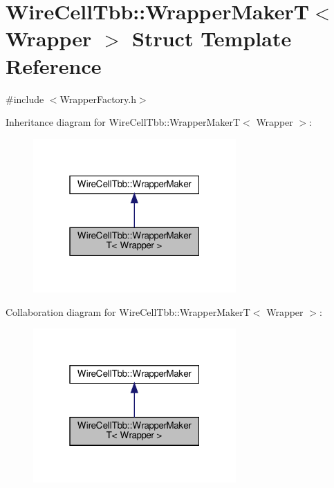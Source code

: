 \hypertarget{struct_wire_cell_tbb_1_1_wrapper_maker_t}{}\section{Wire\+Cell\+Tbb\+:\+:Wrapper\+MakerT$<$ Wrapper $>$ Struct Template Reference}
\label{struct_wire_cell_tbb_1_1_wrapper_maker_t}


{\ttfamily \#include $<$Wrapper\+Factory.\+h$>$}



Inheritance diagram for Wire\+Cell\+Tbb\+:\+:Wrapper\+MakerT$<$ Wrapper $>$\+:
\nopagebreak
\begin{figure}[H]
\begin{center}
\leavevmode
\includegraphics[width=220pt]{struct_wire_cell_tbb_1_1_wrapper_maker_t__inherit__graph}
\end{center}
\end{figure}


Collaboration diagram for Wire\+Cell\+Tbb\+:\+:Wrapper\+MakerT$<$ Wrapper $>$\+:
\nopagebreak
\begin{figure}[H]
\begin{center}
\leavevmode
\includegraphics[width=220pt]{struct_wire_cell_tbb_1_1_wrapper_maker_t__coll__graph}
\end{center}
\end{figure}
